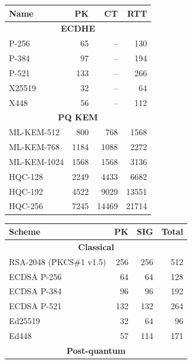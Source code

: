 \documentclass[letterpaper,12pt,titlepage,oneside,final]{book}
\begin{document}
\begin{table}[htbp]
    \centering\scriptsize
    \begin{tabular}[t]{lrrr}
    \toprule
        \textbf{Name} 
        & \textbf{PK} 
        & \textbf{CT}
        & \textbf{RTT} \\
    \midrule
        \multicolumn{4}{c}{\bf ECDHE} \\
    \midrule
        P-256           & 65    & --    & 130  \\
        P-384           & 97    & --    & 194  \\
        P-521           & 133   & --    & 266 \\
        X25519          & 32    & --    & 64  \\
        X448            & 56    & --    & 112 \\
    \midrule
        \multicolumn{4}{c}{\bf PQ KEM} \\
    \midrule
        ML-KEM-512      & 800   & 768   & 1568 \\
        ML-KEM-768      & 1184  & 1088  & 2272 \\
        ML-KEM-1024     & 1568  & 1568  & 3136 \\
        HQC-128         & 2249  & 4433  & 6682 \\
        HQC-192         & 4522  & 9029  & 13551 \\
        HQC-256         & 7245  & 14469 & 21714 \\
    \bottomrule
    \end{tabular}
    \begin{tabular}[t]{lrrr}
    \toprule
        \textbf{Scheme} 
        & \textbf{PK} 
        & \textbf{SIG}
        & \textbf{Total} \\
    \midrule
        \multicolumn{4}{c}{\bf Classical} \\
    \midrule
        RSA-2048 (PKCS\#1 v1.5) & 256   & 256   & 512   \\
        ECDSA P-256             & 64    & 64    & 128   \\
        ECDSA P-384             & 96    & 96    & 192   \\
        ECDSA P-521             & 132   & 132   & 264   \\
        Ed25519                 & 32    & 64    & 96    \\
        Ed448                   & 57    & 114   & 171   \\
    \midrule
        \multicolumn{4}{c}{\bf Post-quantum} \\

\end{tabular}
\end{table}
\end{document}
